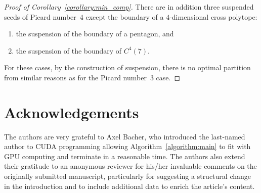 \documentclass[11pt]{amsart}
\theoremstyle{plain}
\numberwithin{equation}{section}
\theoremstyle{definition}
\begin{document}
\begin{proof}[Proof of Corollary~\ref{corollary:min_comp}]
	There are in addition three suspended seeds of Picard number~$4$ except the boundary of a $4$-dimensional cross polytope:
	\begin{enumerate}
		\item the suspension of the boundary of a pentagon, and
		\item the suspension of the boundary of $C^4(7)$.
	\end{enumerate}
	For these cases, by the construction of suspension, there is no optimal partition from similar reasons as for the Picard number~$3$ case.
\end{proof}

\section*{Acknowledgements}
The authors are very grateful to Axel Bacher, who introduced the last-named author to CUDA programming allowing Algorithm~\ref{algorithm:main} to fit with GPU computing and terminate in a reasonable time.
The authors also extend their gratitude to an anonymous reviewer for his/her invaluable comments on the originally submitted manuscript, particularly for suggesting a structural change in the introduction and to include additional data to enrich the article's content.
\end{document}
